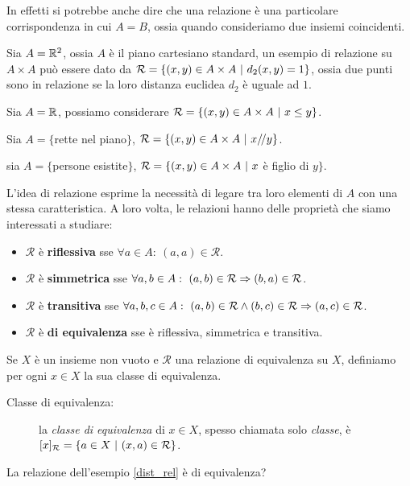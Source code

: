 		In effetti si potrebbe anche dire che una relazione è una particolare corrispondenza in cui $A=B$, ossia quando consideriamo due insiemi coincidenti.
		\begin{eg}\label{dist_rel}
			Sia $A=\mathbb{R}^2$, ossia $A$ è il piano cartesiano standard, un esempio di relazione su $A\times A$ può essere dato da $\mathcal{R}=\{(x,y)\in A\times A\ \rvert\  d_2(x,y)=1\}$, ossia due punti sono in relazione se la loro distanza euclidea $d_2$ è uguale ad $1$.
		\end{eg}
		\begin{eg}
			Sia $A=\mathbb{R}$, possiamo considerare $\mathcal{R}=\{(x,y)\in A\times A\ \rvert\  x\leq y\}$.
		\end{eg}
		\begin{eg}
			Sia $A=\{$rette nel piano$\}$, $\mathcal{R}=\{(x,y)\in A\times A\ \rvert\  x/\!/ y\}$.
		\end{eg}
		\begin{eg}
			sia $A=\{$persone esistite$\}$, $\mathcal{R}=\{(x,y)\in A\times A\ \rvert\  x$ è figlio di $y\}$.
		\end{eg}
		L'idea di relazione esprime la necessità di legare tra loro elementi di $A$ con una stessa caratteristica. A loro volta, le relazioni hanno delle proprietà che siamo interessati a studiare:
		\begin{itemize}
			\item $\mathcal{R}$ è \textbf{riflessiva} sse $\forall a\in A:\ (a,a)\in\mathcal{R}$.
			\item $\mathcal{R}$ è \textbf{simmetrica} sse $\forall a,b\in A:\ (a,b)\in\mathcal{R} \Rightarrow (b,a)\in\mathcal{R}$.
			\item $\mathcal{R}$ è \textbf{transitiva} sse $\forall a,b,c\in A:\ (a,b)\in\mathcal{R} \land (b,c)\in\mathcal{R} \Rightarrow (a,c)\in\mathcal{R}$.
			\item $\mathcal{R}$ è \textbf{di equivalenza} sse è riflessiva, simmetrica e transitiva.
		\end{itemize}
		Se $X$ è un insieme non vuoto e $\mathcal{R}$ una relazione di equivalenza su $X$, definiamo per ogni $x\in X$ la sua classe di equivalenza.
		\begin{description}
			\item[Classe di equivalenza:] la \emph{classe di equivalenza} di $x\in X$, spesso chiamata solo \emph{classe}, è $[x]_{\mathcal{R}} = \{a\in X\ \rvert\  (x,a)\in\mathcal{R}\}$.
		\end{description}
		\begin{es}
			La relazione dell'esempio \ref{dist_rel} è di equivalenza?
		\end{es}
